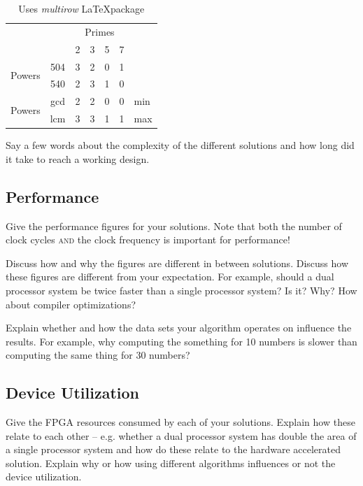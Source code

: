 \documentclass[11pt]{article}
\begin{document}
\begin{table}[htbp]
   \centering 
 \begin{tabular}{cc|c|c|c|c|l}
\cline{3-6}
& & \multicolumn{4}{|c|}{Primes} \\ \cline{3-6}
& & 2 & 3 & 5 & 7 \\ \cline{1-6}
\multicolumn{1}{|c|}{\multirow{2}{*}{Powers}} &
\multicolumn{1}{|c|}{504} & 3 & 2 & 0 & 1 &     \\ \cline{2-6}
\multicolumn{1}{|c|}{}                        &
\multicolumn{1}{|c|}{540} & 2 & 3 & 1 & 0 &     \\ \cline{1-6}
\multicolumn{1}{|c|}{\multirow{2}{*}{Powers}} &
\multicolumn{1}{|c|}{gcd} & 2 & 2 & 0 & 0 & min \\ \cline{2-6}
\multicolumn{1}{|c|}{}                        &
\multicolumn{1}{|c|}{lcm} & 3 & 3 & 1 & 1 & max \\ \cline{1-6}
\end{tabular}
  \caption{Uses \textit{multirow} \LaTeX package}
   \label{tab:example2}
\end{table}
Say a few words about the complexity of the different solutions and how long did it take to reach a working design.
 
\subsection{Performance}
Give the performance figures for your solutions. Note that both the number of clock cycles \textsc{and} the clock frequency is important for performance! 

Discuss how and why the figures are different in between solutions. Discuss how these figures are different from your expectation. For example, should a dual processor system be twice faster than a single processor system? Is it? Why?
How about compiler optimizations? 

Explain whether and how the data sets your algorithm operates on influence the results. For example, why computing the something for 10 numbers is slower than computing the same thing for 30 numbers?

\subsection{Device Utilization}
Give the FPGA resources consumed by each of your solutions. Explain how these relate to each other -- e.g. whether a dual processor system has double the area of a single processor system and how do these relate to the hardware accelerated solution. Explain why or how using different algorithms influences or not the device utilization.
\end{document}
